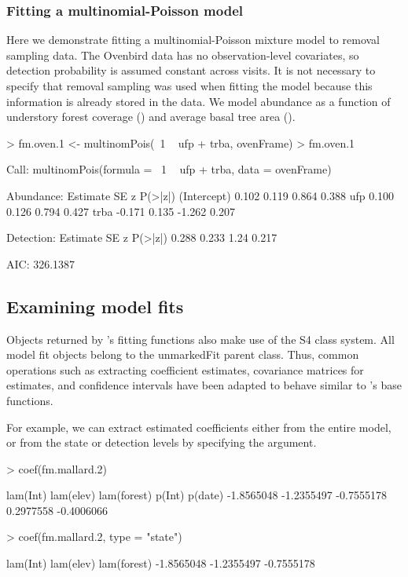 \documentclass[article,shortnames]{jss}
\newcommand{\um}{\pkg{unmarked}}
\newcommand{\rlang}{\proglang{R}}
\begin{document}
\subsubsection{Fitting a multinomial-Poisson model}

Here we demonstrate fitting a multinomial-Poisson mixture model to removal 
sampling data.  The Ovenbird data has no observation-level covariates, so 
detection probability is assumed constant across visits.  It is not necessary
to specify that removal sampling was used when fitting the model
because this information is already stored in the  data.
We model abundance as a function of understory forest coverage ()
and average basal tree area ().

\begin{Schunk}
\begin{Sinput}
> fm.oven.1 <- multinomPois(~1 ~ ufp + trba, ovenFrame)
> fm.oven.1
\end{Sinput}
\begin{Soutput}
Call:
multinomPois(formula = ~1 ~ ufp + trba, data = ovenFrame)

Abundance:
            Estimate    SE      z P(>|z|)
(Intercept)    0.102 0.119  0.864   0.388
ufp            0.100 0.126  0.794   0.427
trba          -0.171 0.135 -1.262   0.207

Detection:
 Estimate    SE    z P(>|z|)
    0.288 0.233 1.24   0.217

AIC: 326.1387 
\end{Soutput}
\end{Schunk}

\subsection{Examining model fits}
\label{sec:examining-model-fits}

Objects returned by \um's fitting functions also make use of the S4
class system.  All model fit objects belong to the unmarkedFit parent
class.  Thus, common operations such as extracting coefficient
estimates, covariance matrices for estimates, and confidence intervals
have been adapted to behave similar to \rlang's base functions.

For example, we can extract estimated coefficients either from the
entire model, or from the state or detection levels by specifying the
 argument.

\begin{Schunk}
\begin{Sinput}
> coef(fm.mallard.2)
\end{Sinput}
\begin{Soutput}
   lam(Int)   lam(elev) lam(forest)      p(Int)     p(date) 
 -1.8565048  -1.2355497  -0.7555178   0.2977558  -0.4006066 
\end{Soutput}
\begin{Sinput}
> coef(fm.mallard.2, type = "state")
\end{Sinput}
\begin{Soutput}
   lam(Int)   lam(elev) lam(forest) 
 -1.8565048  -1.2355497  -0.7555178 
\end{Soutput}
\end{Schunk}
\end{document}
